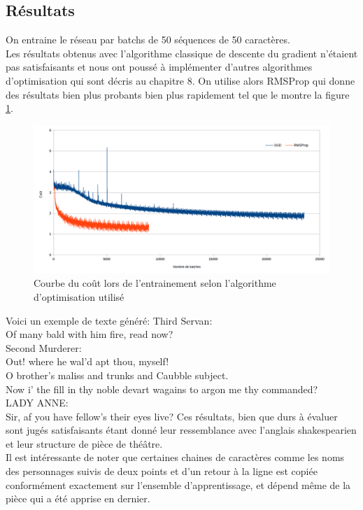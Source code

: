 \subsection{Résultats}

On entraine le réseau par batchs de 50 séquences de 50 caractères.
\\Les résultats obtenus avec l'algorithme classique de descente du gradient n'étaient pas satisfaisants et nous ont poussé à implémenter d'autres algorithmes d'optimisation qui sont décris au chapitre 8. On utilise alors RMSProp qui donne des résultats bien plus probants bien plus rapidement tel que le montre la figure \ref{RMSProp_vs_SGD}.


\begin{figure}
\begin{center}
\includegraphics[scale=0.5]{images/chapter7/RMSProp_vs_SGD.png}
\caption{Courbe du coût lors de l'entrainement selon l'algorithme d'optimisation utilisé}
\label{RMSProp_vs_SGD}
\end{center}
\end{figure}
\medskip

Voici un exemple de texte généré:
\medbreak
Third Servan:\\
Of many bald with him fire, read now?\\

Second Murderer:\\
Out! where he wal’d apt thou, myself!\\
O brother’s maliss and trunks and Caubble subject.\\
Now i’ the fill in thy noble devart wagains to argon me
thy commanded?\\

LADY ANNE:\\
Sir, af you have fellow’s their eyes live?
\medbreak
Ces résultats, bien que durs à évaluer sont jugés satisfaisants étant donné leur ressemblance avec l'anglais shakespearien et leur structure de pièce de théâtre.
\\Il est intéressante de noter que certaines chaines de caractères comme les noms des personnages suivis de deux points et d'un retour à la ligne est copiée conformément exactement sur l'ensemble d'apprentissage, et dépend même de la pièce qui a été apprise en dernier.
